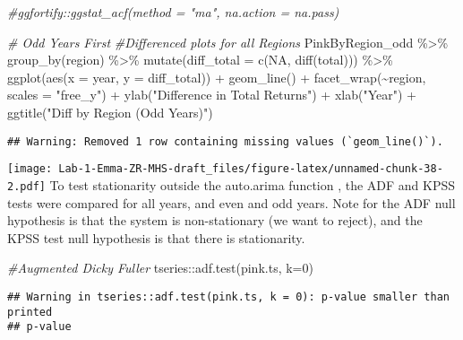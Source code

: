 \documentclass[
]{article}
\newenvironment{Shaded}{\begin{snugshade}}{\end{snugshade}}
\newcommand{\AttributeTok}[1]{\textcolor[rgb]{0.77,0.63,0.00}{#1}}
\newcommand{\CommentTok}[1]{\textcolor[rgb]{0.56,0.35,0.01}{\textit{#1}}}
\newcommand{\ConstantTok}[1]{\textcolor[rgb]{0.00,0.00,0.00}{#1}}
\newcommand{\DecValTok}[1]{\textcolor[rgb]{0.00,0.00,0.81}{#1}}
\newcommand{\FunctionTok}[1]{\textcolor[rgb]{0.00,0.00,0.00}{#1}}
\newcommand{\NormalTok}[1]{#1}
\newcommand{\SpecialCharTok}[1]{\textcolor[rgb]{0.00,0.00,0.00}{#1}}
\newcommand{\StringTok}[1]{\textcolor[rgb]{0.31,0.60,0.02}{#1}}
\begin{document}
\begin{Shaded}
\begin{Highlighting}[]
  \CommentTok{\#ggfortify::ggstat\_acf(method = "ma", na.action = na.pass)}

\CommentTok{\# Odd Years First }
\CommentTok{\#Differenced plots for all Regions }
\NormalTok{PinkByRegion\_odd }\SpecialCharTok{\%\textgreater{}\%}
  \FunctionTok{group\_by}\NormalTok{(region) }\SpecialCharTok{\%\textgreater{}\%}
  \FunctionTok{mutate}\NormalTok{(}\AttributeTok{diff\_total =} \FunctionTok{c}\NormalTok{(}\ConstantTok{NA}\NormalTok{, }\FunctionTok{diff}\NormalTok{(total))) }\SpecialCharTok{\%\textgreater{}\%}
  \FunctionTok{ggplot}\NormalTok{(}\FunctionTok{aes}\NormalTok{(}\AttributeTok{x =}\NormalTok{ year, }\AttributeTok{y =}\NormalTok{ diff\_total)) }\SpecialCharTok{+}
  \FunctionTok{geom\_line}\NormalTok{() }\SpecialCharTok{+}
  \FunctionTok{facet\_wrap}\NormalTok{(}\SpecialCharTok{\textasciitilde{}}\NormalTok{region, }\AttributeTok{scales =} \StringTok{"free\_y"}\NormalTok{) }\SpecialCharTok{+}
  \FunctionTok{ylab}\NormalTok{(}\StringTok{"Difference in Total Returns"}\NormalTok{) }\SpecialCharTok{+}
  \FunctionTok{xlab}\NormalTok{(}\StringTok{"Year"}\NormalTok{) }\SpecialCharTok{+}
  \FunctionTok{ggtitle}\NormalTok{(}\StringTok{"Diff by Region (Odd Years)"}\NormalTok{) }
\end{Highlighting}
\end{Shaded}

\begin{verbatim}
## Warning: Removed 1 row containing missing values (`geom_line()`).
\end{verbatim}

\texttt{[image: Lab-1-Emma-ZR-MHS-draft\_files/figure-latex/unnamed-chunk-38-2.pdf]}
To test stationarity outside the auto.arima function , the ADF and KPSS
tests were compared for all years, and even and odd years. Note for the
ADF null hypothesis is that the system is non-stationary (we want to
reject), and the KPSS test null hypothesis is that there is
stationarity.

\begin{Shaded}
\begin{Highlighting}[]
\CommentTok{\#Augmented Dicky Fuller }
\NormalTok{tseries}\SpecialCharTok{::}\FunctionTok{adf.test}\NormalTok{(pink.ts, }\AttributeTok{k=}\DecValTok{0}\NormalTok{)}
\end{Highlighting}
\end{Shaded}

\begin{verbatim}
## Warning in tseries::adf.test(pink.ts, k = 0): p-value smaller than printed
## p-value
\end{verbatim}
\end{document}
